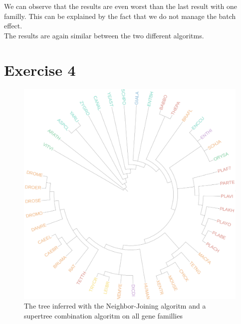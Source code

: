 \documentclass[]{article}
\theoremstyle{definition}
\begin{document}
We can observe that the results are even worst than the last result with one familly. This can be explained by the fact that we do not manage the batch effect.\\
The results are again similar between the two different algoritms.

\section{Exercise 4}

\begin{figure}[H]
	\includegraphics*[width = \linewidth]{image/NJ_supertree.pdf}
	\caption{ The tree inferred with the Neighbor-Joining algoritm and a supertree combination algoritm on all gene famillies }
\end{figure}
\end{document}
